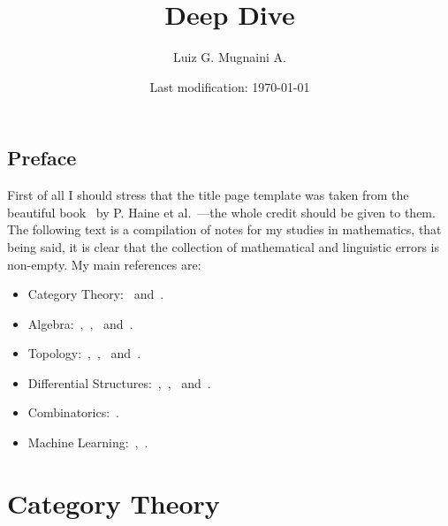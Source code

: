 

\newcommand{\onlyinsubfile}[1]{#1}
\newcommand{\notinsubfile}[1]{}

\author{Luiz G. Mugnaini A.}
\date{Last modification: \today}
\title{Deep Dive}



\renewcommand{\onlyinsubfile}[1]{}
\renewcommand{\notinsubfile}[1]{#1}

\frontmatter


\maketitle

\tableofcontents
\listoftodos

\pagestyle{plain}

\chapter{Preface}

First of all I should stress that the title page template was taken from the
beautiful book~\cite{Haine21DiffCoho} by P. Haine et al.~---the whole credit
should be given to them. The following text is a compilation of notes for my
studies in mathematics, that being said, it is clear that the collection of
mathematical and linguistic errors is non-empty. My main references are:
\begin{itemize}\setlength\itemsep{0em}
    \item Category Theory:~\cite{Rie16} and~\cite{Shap06}.
    \item Algebra:~\cite{Yu89},~\cite{Kim20},~\cite{Aluf09} and~\cite{Lang93}.
    \item Topology:~\cite{Lee11},~\cite{Tai20},~\cite{Mun00} and~\cite{Eng89}.
    \item Differential Structures:~\cite{Zor15},~\cite{Zor16},~\cite{Rud76}
          and~\cite{Jost06}.
    \item Combinatorics:~\cite{Die16}.
    \item Machine Learning:~\cite{Shai14},~\cite{Bishop06}.
\end{itemize}

\mainmatter


\part{Category Theory}

